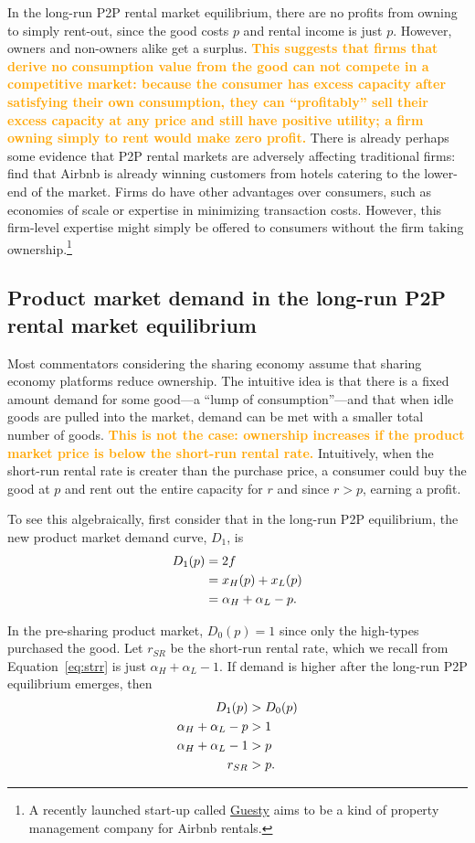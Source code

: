 \documentclass[11pt]{article}
\newcommand{\important}[1]{\textcolor{orange}{\textbf{#1}}}
\newcommand{\important}[1]{#1}
\begin{document}
In the long-run P2P rental market equilibrium, there are no profits from owning to simply rent-out, since the good costs $p$ and rental income is just $p$.  
However, owners and non-owners alike get a surplus. 
\important{This suggests that firms that derive no consumption value from the good can not compete in a competitive market: 
because the consumer has excess capacity after satisfying their own consumption, they can ``profitably'' sell their excess capacity at any price and still have positive utility; a firm owning simply to rent would make zero profit.} 
There is already perhaps some evidence that P2P rental markets are adversely affecting traditional firms: 
\cite{byers2013rise} find that Airbnb is already winning customers from hotels catering to the lower-end of the market. 
Firms do have other advantages over consumers, such as economies of scale or expertise in minimizing transaction costs. 
However, this firm-level expertise might simply be offered to consumers without the firm taking ownership.\footnote{A recently launched start-up called \href{https://www.guesty.com/}{Guesty} aims to be a kind of property management company for Airbnb rentals.} 

\subsection{Product market demand in the long-run P2P rental market equilibrium} 
Most commentators considering the sharing economy assume that sharing economy platforms reduce ownership. 
The intuitive idea is that there is a fixed amount demand for some good---a ``lump of consumption''---and that when idle goods are pulled into the market, demand can be met with a smaller total number of goods.
\important{This is not the case:  
ownership increases if the product market price is below the short-run rental rate.} 
Intuitively, when the short-run rental rate is creater than the purchase price, a consumer could buy the good at $p$ and rent out the entire capacity for $r$ and since $r > p$, earning a profit. 

To see this algebraically, first consider that in the long-run P2P equilibrium, the new product market demand curve, $D_1$, is
\begin{align}
D_1(p) &= 2f \notag \\  
     &= x_H(p) + x_L(p) \notag \\ 
     &= \alpha_H + \alpha_L - p.  
\end{align} 

In the pre-sharing product market, $D_0(p) = 1$ since only the high-types purchased the good. 
Let $r_{SR}$ be the short-run rental rate, which we recall from Equation~\ref{eq:strr} is just $\alpha_H + \alpha_L - 1$. 
If demand is higher after the long-run P2P equilibrium emerges, then  
\begin{align} 
D_{1}(p) & > D_{0}(p) \notag \\
\alpha_H + \alpha_L - p &> 1 \notag \\ 
\alpha_H + \alpha_L - 1 &> p \notag \\ 
r_{SR} &>  p. 
\end{align} 
\end{document}
